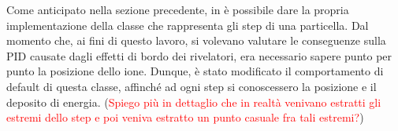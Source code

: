 Come anticipato nella sezione precedente, in \geant{} è possibile dare la propria implementazione della classe che rappresenta gli step di una particella.
Dal momento che, ai fini di questo lavoro, si volevano valutare le conseguenze sulla PID causate dagli effetti di bordo dei rivelatori, era necessario sapere punto per punto la posizione dello ione. 
Dunque, è stato modificato il comportamento di default di questa classe, affinché ad ogni step si conoscessero la posizione e il deposito di energia.
(\textcolor{red}{Spiego più in dettaglio che in realtà venivano estratti gli estremi dello step e poi veniva estratto un punto casuale fra tali estremi?})








\subsection{}

